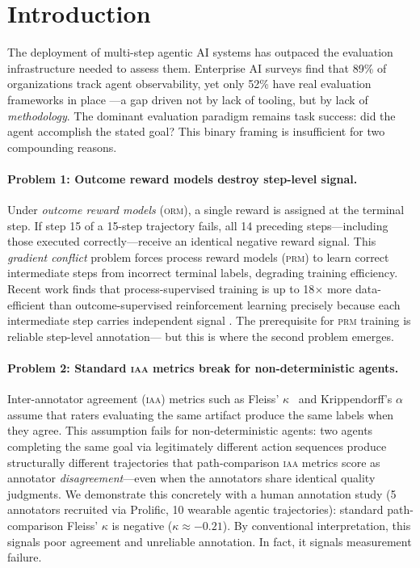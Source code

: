 \documentclass{article}
\begin{document}
\section{Introduction}
\label{sec:intro}

The deployment of multi-step agentic AI systems has outpaced the evaluation
infrastructure needed to assess them.
%
Enterprise AI surveys find that 89\% of organizations track agent
observability, yet only 52\% have real evaluation frameworks in place
\cite{koreai2025}---a gap driven not by lack of tooling, but by lack of
\emph{methodology}.
%
The dominant evaluation paradigm remains task success: did the agent
accomplish the stated goal?
%
This binary framing is insufficient for two compounding reasons.

\paragraph{Problem 1: Outcome reward models destroy step-level signal.}
Under \emph{outcome reward models} (\textsc{orm}), a single reward is
assigned at the terminal step.
%
If step 15 of a 15-step trajectory fails, all 14 preceding steps---including
those executed correctly---receive an identical negative reward signal.
%
This \emph{gradient conflict} problem forces process reward models (\textsc{prm})
to learn correct intermediate steps from incorrect terminal labels,
degrading training efficiency.
%
Recent work finds that process-supervised training is up to 18$\times$ more
data-efficient than outcome-supervised reinforcement learning precisely because
each intermediate step carries independent signal \cite{reasonrag2025}.
%
The prerequisite for \textsc{prm} training is reliable step-level annotation---
but this is where the second problem emerges.

\paragraph{Problem 2: Standard \textsc{iaa} metrics break for non-deterministic agents.}
Inter-annotator agreement (\textsc{iaa}) metrics such as Fleiss'
$\kappa$~\cite{fleiss1971} and Krippendorff's $\alpha$~\cite{krippendorff2011}
assume that raters evaluating the same artifact produce the same labels when
they agree.
%
This assumption fails for non-deterministic agents: two agents completing the
same goal via legitimately different action sequences produce structurally
different trajectories that path-comparison \textsc{iaa} metrics score as
annotator \emph{disagreement}---even when the annotators share identical
quality judgments.
%
We demonstrate this concretely with a human annotation study (5 annotators
recruited via Prolific, 10 wearable agentic trajectories): standard
path-comparison Fleiss' $\kappa$ is negative ($\kappa \approx -0.21$).
%
By conventional interpretation, this signals poor agreement and unreliable
annotation.
%
In fact, it signals measurement failure.
\end{document}
